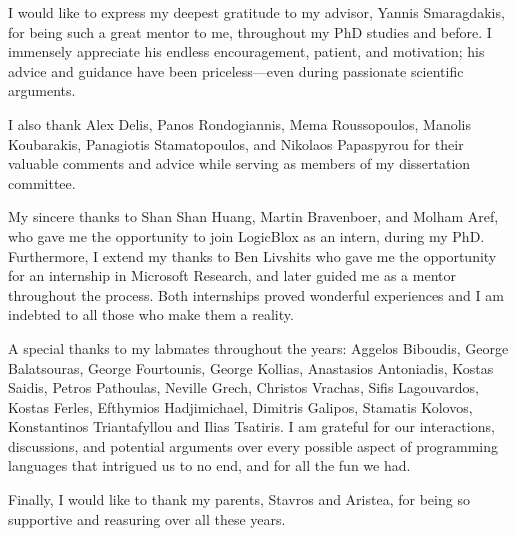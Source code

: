 I would like to express my deepest gratitude to my advisor, Yannis Smaragdakis, for being such a great mentor to me, throughout my PhD studies and before. I immensely appreciate his endless encouragement, patient, and motivation; his advice and guidance have been priceless---even during passionate scientific arguments.

I also thank Alex Delis, Panos Rondogiannis, Mema Roussopoulos, Manolis Koubarakis, Panagiotis Stamatopoulos, and Nikolaos Papaspyrou for their valuable comments and advice while serving as members of my dissertation committee.

My sincere thanks to Shan Shan Huang, Martin Bravenboer, and Molham Aref, who gave me the opportunity to join LogicBlox as an intern, during my PhD. Furthermore, I extend my thanks to Ben Livshits who gave me the opportunity for an internship in Microsoft Research, and later guided me as a mentor throughout the process. Both internships proved wonderful experiences and I am indebted to all those who make them a reality.

A special thanks to my labmates throughout the years: Aggelos Biboudis, George Balatsouras, George Fourtounis, George Kollias, Anastasios Antoniadis, Kostas Saidis, Petros Pathoulas, Neville Grech, Christos Vrachas, Sifis Lagouvardos, Kostas Ferles, Efthymios Hadjimichael, Dimitris Galipos, Stamatis Kolovos, Konstantinos Triantafyllou and Ilias Tsatiris. I am grateful for our interactions, discussions, and potential arguments over every possible aspect of programming languages that intrigued us to no end, and for all the fun we had.

Finally, I would like to thank my parents, Stavros and Aristea, for being so supportive and reasuring over all these years.